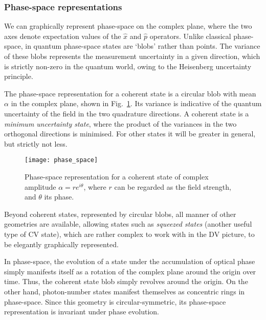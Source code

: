 
\subsubsection{Phase-space representations}

We can graphically represent phase-space on the complex plane, where the two axes denote expectation values of the $\hat{x}$ and $\hat{p}$ operators. Unlike classical phase-space, in quantum phase-space states are `blobs' rather than points. The variance of these blobs represents the measurement uncertainty in a given direction, which is strictly non-zero in the quantum world, owing to the Heisenberg uncertainty principle.

The phase-space representation for a coherent state is a circular blob with mean $\alpha$ in the complex plane, shown in Fig.~\ref{fig:phase_space}. Its variance is indicative of the quantum uncertainty of the field in the two quadrature directions. A coherent state is a \textit{minimum uncertainty state}, where the product of the variances in the two orthogonal directions is minimised. For other states it will be greater in general, but strictly not less.

\begin{figure}[!htbp]
\texttt{[image: phase\_space]}
\captionspacefig \caption{Phase-space representation for a coherent state of complex amplitude \mbox{$\alpha=re^{i\theta}$}, where $r$ can be regarded as the field strength, and $\theta$ its phase.}\label{fig:phase_space}
\end{figure}

Beyond coherent states, represented by circular blobs, all manner of other geometries are available, allowing states such as \textit{squeezed states} (another useful type of CV state), which are rather complex to work with in the DV picture, to be elegantly graphically represented.

In phase-space, the evolution of a state under the accumulation of optical phase simply manifests itself as a rotation of the complex plane around the origin over time. Thus, the coherent state blob simply revolves around the origin. On the other hand, photon-number states manifest themselves as concentric rings in phase-space. Since this geometry is circular-symmetric, its phase-space representation is invariant under phase evolution.